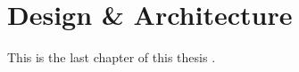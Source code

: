 %
\section{Design \& Architecture}\label{sec:design_architecture}
%
This is the last chapter of this thesis \cite{tur38}.
%

